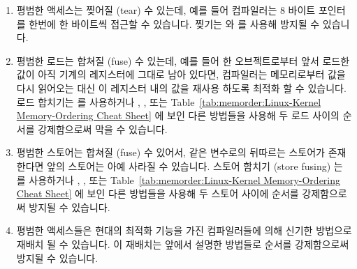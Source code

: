 \begin{enumerate}
\item	평범한 액세스는 찢어질 (tear) 수 있는데, 예를 들어 컴파일러는 8 바이트
	포인터를 한번에 한 바이트씩 접근할 수 있습니다.
	찢기는  와  를 사용해 방지될 수
	있습니다.
\item	평범한 로드는 합쳐질 (fuse) 수 있는데, 예를 들어 한 오브젝트로부터 앞서
	로드한 값이 아직 기계의 레지스터에 그대로 남아 있다면, 컴파일러는
	메모리로부터 값을 다시 읽어오는 대신 이 레지스터 내의 값을 재사용
	하도록 최적화 할 수 있습니다.
	로드 합치기는  를 사용하거나 ,
	, 또는
	Table~\ref{tab:memorder:Linux-Kernel Memory-Ordering Cheat Sheet} 에
	보인 다른 방법들을 사용해 두 로드 사이의 순서를 강제함으로써 막을 수
	있습니다.

\item	평범한 스토어는 합쳐질 (fuse) 수 있어서, 같은 변수로의 뒤따르는
	스토어가 존재한다면 앞의 스토어는 아예 사라질 수 있습니다.
	스토어 함치기 (store fusing) 는  를 사용하거나
	, , 또는
	Table~\ref{tab:memorder:Linux-Kernel Memory-Ordering Cheat Sheet} 에
	보인 다른 방법들을 사용해 두 스토어 사이에 순서를 강제함으로써 방지될
	수 있습니다.
\item	평범한 액세스들은 현대의 최적화 기능을 가진 컴파일러들에 의해 신기한
	방법으로 재배치 될 수 있습니다.
	이 재배치는 앞에서 설명한 방법들로 순서를 강제함으로써 방지될 수
	있습니다.
\iffalse


\end{enumerate}
